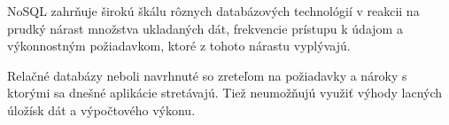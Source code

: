 	
	\ac{NoSQL} zahrňuje širokú škálu rôznych databázových technológií v reakcii na prudký nárast množstva ukladaných dát, frekvencie prístupu k údajom a výkonnostným požiadavkom, ktoré z tohoto nárastu  vyplývajú.
	
	Relačné databázy neboli navrhnuté so zreteľom na požiadavky a nároky s ktorými sa dnešné aplikácie stretávajú. Tiež neumožňujú využiť výhody lacných úložísk dát a výpočtového výkonu.
	
	
	
